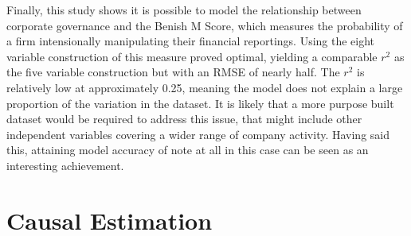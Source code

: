 {Finally, this study shows it is possible to model the relationship between corporate governance and the Benish M Score, which measures the probability of a firm intensionally manipulating their financial reportings. Using the eight variable construction of this measure proved optimal, yielding a comparable $r^2$ as the five variable construction but with an RMSE of nearly half. The $r^2$ is relatively low at approximately 0.25, meaning the model does not explain a large proportion of the variation in the dataset. It is likely that a more purpose built dataset would be required to address this issue, that might include other independent variables covering a wider range of company activity. Having said this, attaining model accuracy of note at all in this case can be seen as an interesting achievement.   }
\section{Causal Estimation}
